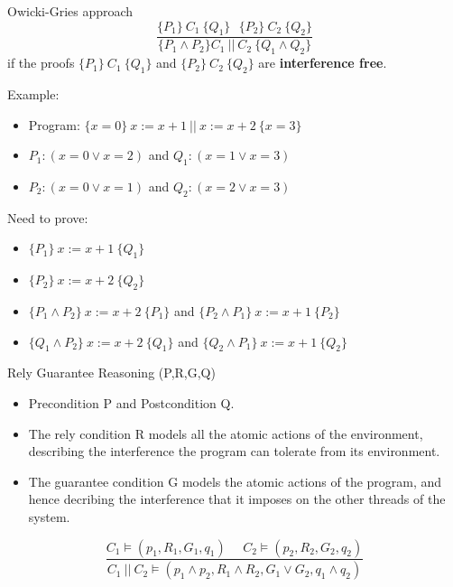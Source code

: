 \documentclass[11pt]{beamer}
\begin{document}
\begin{frame}{Owicki-Gries approach}
  $$\frac{\{P_1\}~C_1~\{Q_1\}~~~\{P_2\}~C_2~\{Q_2\}}{\{P_1 \land P_2\} C_1~||~C_2~\{Q_1 \land Q_2\}}$$
  if the proofs $\{P_1\}~C_1~\{Q_1\}$ and $\{P_2\}~C_2~\{Q_2\}$ are {\bf interference free}.
  \pause

  Example:
  \begin{itemize}
  \item Program: $\{x = 0\}~ x := x + 1 ~||~ x := x + 2 ~\{x = 3\}$
    \pause
    \item $P_1:  (x = 0 \lor x = 2)$ and $Q_1: (x = 1 \lor x = 3)$
    \item $P_2: (x = 0 \lor x = 1)$ and $Q_2: (x = 2 \lor x = 3)$
    \end{itemize}
\pause
Need to prove:
\begin{itemize}
\item $\{P_1\}~ x := x + 1~ \{Q_1\}$
\item $\{P_2\}~ x := x + 2 ~\{Q_2\}$
  \pause
\item $\{P_1 \land P_2\}~ x := x + 2 ~\{P_1\} $ and $\{P_2 \land P_1\} ~x := x + 1 ~\{P_2\} $
  \item $\{Q_1 \land P_2\}~ x := x + 2 ~\{Q_1\} $ and  $\{Q_2 \land P_1\}~ x := x + 1 ~\{Q_2\} $
\end{itemize}
\end{frame}

\begin{frame}{Rely Guarantee Reasoning (P,R,G,Q)}
  \begin{itemize}
  \item Precondition P and Postcondition Q.
  \item The rely condition R models all the atomic actions of the environment,
    describing the interference the  program can tolerate from its environment.
  \item The guarantee condition G models the atomic actions of the program, and
    hence decribing the interference that it imposes on the other threads of the system.
  \end{itemize}
  \pause
  $$\frac{C_1 \models (p_1, R_1,G_1,q_1)~~~~~~ C_2 \models (p_2, R_2, G_2, q_2)}{C_1~||~C_2 \models (p_1 \land
    p_2, R_1 \land R_2, G_1 \lor G_2, q_1 \land q_2)}$$
\end{frame}
\end{document}
